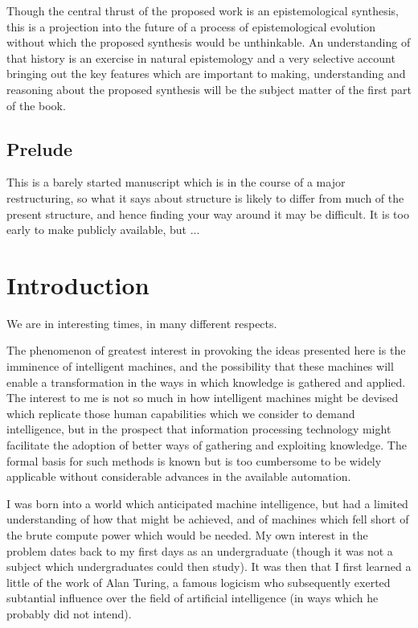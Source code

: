 \documentclass[10pt,titlepage]{book}
\begin{document}
Though the central thrust of the proposed work is an epistemological synthesis, this is a projection into the future of a process of epistemological evolution without which the proposed synthesis would be unthinkable.  An understanding of that history is an exercise in natural epistemology and a very selective account bringing out the key features which are important to making, understanding and reasoning about the proposed synthesis will be the subject matter of the first part of the book.

\section*{Prelude}

This is a barely started manuscript which is in the course of a major restructuring, so what it says about structure is likely to differ from much of the present structure, and hence finding your way around it may be difficult.
It is too early to make publicly available, but ...

\chapter{Introduction}

We are in interesting times, in many different respects.

The phenomenon of greatest interest in provoking the ideas presented here is the imminence of intelligent machines, and the possibility that these machines will enable a transformation in the ways in which knowledge is gathered and applied.
The interest to me is not so much in how intelligent machines might be devised which replicate those human capabilities which we consider to demand intelligence, but in the prospect that information processing technology might facilitate the adoption of better ways of gathering and exploiting knowledge.
The formal basis for such methods is known but is too cumbersome to be widely applicable without considerable advances in the available automation.

I was born into a world which anticipated machine intelligence, but had a limited understanding of how that might be achieved, and of machines which fell short of the brute compute power which would be needed. 
My own interest in the problem dates back to my first days as an undergraduate (though it was not a subject which undergraduates could then study).
It was then that I first learned a little of the work of Alan Turing, a famous logicism who subsequently exerted subtantial influence over the field of artificial intelligence (in ways which he probably did not intend).
\end{document}
